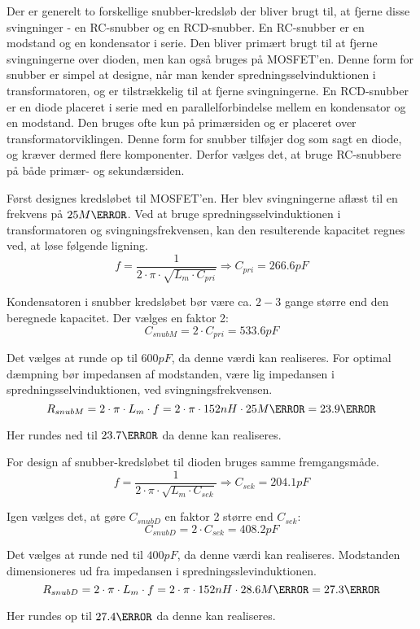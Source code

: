 Der er generelt to forskellige snubber-kredsløb der bliver brugt til, at fjerne disse svingninger - en RC-snubber og en RCD-snubber\cite{snubber_design}. En RC-snubber er en modstand og en kondensator i serie. Den bliver primært brugt til at fjerne svingningerne over dioden, men kan også bruges på MOSFET'en. Denne form for snubber er simpel at designe, når man kender spredningsselvinduktionen i transformatoren, og er tilstrækkelig til at fjerne svingningerne. En RCD-snubber er en diode placeret i serie med en parallelforbindelse mellem en kondensator og en modstand. Den bruges ofte kun på primærsiden og er placeret over transformatorviklingen. Denne form for snubber tilføjer dog som sagt en diode, og kræver dermed flere komponenter. Derfor vælges det, at bruge RC-snubbere på både primær- og sekundærsiden.

Først designes kredsløbet til MOSFET'en. Her blev svingningerne aflæst til en frekvens på $25M\hertz$. Ved at bruge spredningsselvinduktionen i transformatoren og svingningsfrekvensen, kan den resulterende kapacitet regnes ved, at løse følgende ligning.
\begin{equation} \label{eq:MOSFET_snubber}
f = \frac{1}{2 \cdot \pi \cdot \sqrt{L_{m} \cdot C_{pri}}} \Rightarrow C_{pri}=266.6pF
\end{equation}

\noindent Kondensatoren i snubber kredsløbet bør være ca. $2-3$ gange større end den beregnede kapacitet\cite{snubber_design}. Der vælges en faktor 2:
\begin{equation}
C_{snubM} = 2 \cdot C_{pri} = 533.6pF
\end{equation}

\noindent Det vælges at runde op til $600pF$, da denne værdi kan realiseres. For optimal dæmpning bør impedansen af modstanden, være lig impedansen i spredningsselvinduktionen, ved svingningsfrekvensen. 
\begin{equation}
R_{snubM} = 2 \cdot \pi \cdot L_m \cdot f = 2 \cdot \pi \cdot 152nH \cdot 25M\hertz = 23.9\ohm
\end{equation}

\noindent Her rundes ned til $23.7\ohm$ da denne kan realiseres. 

\noindent For design af snubber-kredsløbet til dioden bruges samme fremgangsmåde.
\begin{equation} \label{eq:diode_snubber}
f = \frac{1}{2 \cdot \pi \cdot \sqrt{L_{m} \cdot C_{sek}}} \Rightarrow C_{sek}=204.1pF
\end{equation}

Igen vælges det, at gøre $C_{snubD}$ en faktor 2 større end $C_{sek}$:
\begin{equation}
C_{snubD} = 2 \cdot C_{sek} = 408.2pF
\end{equation}

\noindent Det vælges at runde ned til $400pF$, da denne værdi kan realiseres. Modstanden dimensioneres ud fra impedansen i spredningsslevinduktionen. 
\begin{equation}
R_{snubD} = 2 \cdot \pi \cdot L_m \cdot f = 2 \cdot \pi \cdot 152nH \cdot 28.6M\hertz = 27.3\ohm
\end{equation}

\noindent Her rundes op til $27.4\ohm$ da denne kan realiseres.


